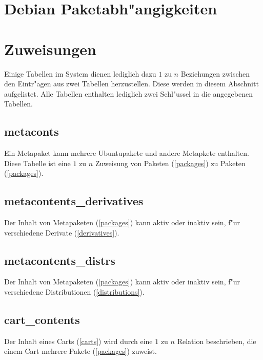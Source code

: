 \documentclass{article}
\begin{document}
\section{Debian Paketabh"angigkeiten}

\section{Zuweisungen}

Einige Tabellen im System dienen lediglich dazu $1$ zu $n$ Beziehungen zwischen den Eintr"agen aus zwei Tabellen herzustellen. Diese werden in diesem Abschnitt aufgelistet. Alle Tabellen enthalten lediglich zwei Schl"ussel in die angegebenen Tabellen.

\subsection{metaconts}

Ein Metapaket kann mehrere Ubuntupakete und andere Metapkete enthalten. Diese Tabelle ist eine $1$ zu $n$ Zuweisung von Paketen (\ref{packages}) zu Paketen (\ref{packages}).

\subsection{metacontents\_derivatives}

Der Inhalt von Metapaketen (\ref{packages}) kann aktiv oder inaktiv sein, f"ur verschiedene Derivate (\ref{derivatives}).

\subsection{metacontents\_distrs}

Der Inhalt von Metapaketen (\ref{packages}) kann aktiv oder inaktiv sein, f"ur verschiedene Distributionen (\ref{distributions}).

\subsection{cart\_contents}

Der Inhalt eines Carts (\ref{carts}) wird durch eine $1$ zu $n$ Relation beschrieben, die einem Cart mehrere Pakete (\ref{packages}) zuweist.
\end{document}
